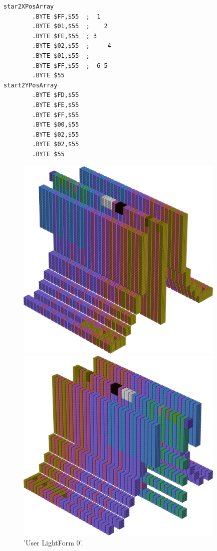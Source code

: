 \begin{lstlisting}
star2XPosArray
        .BYTE $FF,$55  ;  1   
        .BYTE $01,$55  ;    2 
        .BYTE $FE,$55  ; 3    
        .BYTE $02,$55  ;     4
        .BYTE $01,$55  ;      
        .BYTE $FF,$55  ;  6 5 
        .BYTE $55
start2YPosArray
        .BYTE $FD,$55
        .BYTE $FE,$55
        .BYTE $FF,$55
        .BYTE $00,$55
        .BYTE $02,$55
        .BYTE $02,$55
        .BYTE $55
\end{lstlisting}


\begin{figure}[H]
    \centering
    \begin{adjustbox}{width=9cm,center}
      \includegraphics[width=10cm]{src/colorspace_patterns/pattern8-45.png}%
    \end{adjustbox}
    \begin{adjustbox}{width=9cm}
      \includegraphics[width=10cm]{src/colorspace_patterns/pattern8-225.png}%
    \end{adjustbox}
\caption{'User LightForm 0'.}
\end{figure}
\clearpage

